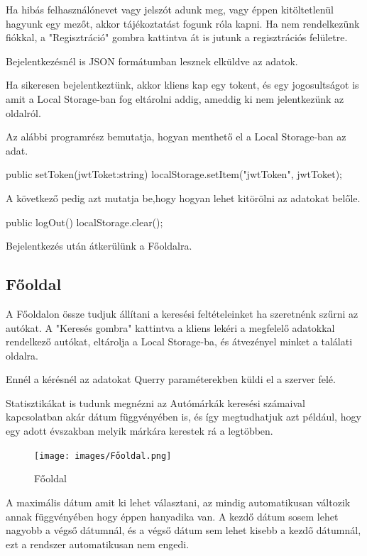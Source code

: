 Ha hibás felhasználónevet vagy jelszót adunk meg, vagy éppen kitöltetlenül hagyunk egy mezőt, akkor tájékoztatást fogunk róla kapni.
Ha nem rendelkezünk fiókkal, a "Regisztráció" gombra kattintva át is jutunk a regisztrációs felületre.

Bejelentkezésnél is JSON formátumban lesznek elküldve az adatok.

Ha sikeresen bejelentkeztünk, akkor kliens kap egy tokent, és egy jogosultságot is amit a Local Storage-ban fog eltárolni addig, ameddig ki nem jelentkezünk az oldalról.

Az alábbi programrész bemutatja, hogyan menthető el a Local Storage-ban az adat.

\begin{java}
 public setToken(jwtToket:string){
    localStorage.setItem("jwtToken", jwtToket);
}
\end{java}
A következő pedig azt mutatja be,hogy hogyan lehet kitörölni az adatokat belőle.

\begin{java}
public logOut(){
    localStorage.clear();
}
\end{java}

Bejelentkezés után átkerülünk a Főoldalra.

\subsection{Főoldal}

A Főoldalon össze tudjuk állítani a keresési feltételeinket ha szeretnénk szűrni az autókat.
A "Keresés gombra" kattintva a kliens lekéri a megfelelő adatokkal rendelkező autókat, eltárolja a Local Storage-ba, és átvezényel minket a találati oldalra.

Ennél a kérésnél az adatokat Querry paraméterekben küldi el a szerver felé.

Statisztikákat is tudunk megnézni az Autómárkák keresési számaival kapcsolatban akár dátum függvényében is, és így megtudhatjuk azt például, hogy egy adott évszakban melyik márkára kerestek rá a legtöbben.

\begin{figure}[h]
\centering
\texttt{[image: images/Főoldal.png]}
\caption{Főoldal}
\label{fig:Főoldal}
\end{figure}

A maximális dátum amit ki lehet választani, az mindig automatikusan változik annak függvényében hogy éppen hanyadika van.
A kezdő dátum sosem lehet nagyobb a végső dátumnál, és a végső dátum sem lehet kisebb a kezdő dátumnál, ezt a rendszer automatikusan nem engedi.

